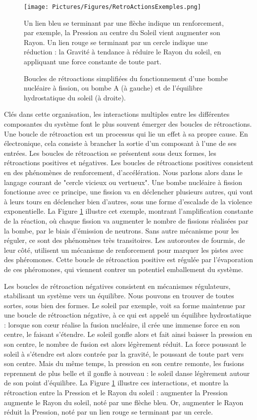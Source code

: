 			\begin{figure}
			\centering
			\texttt{[image: Pictures/Figures/RetroActionsExemples.png]}
			\caption{Boucles de rétroactions simplifiées du fonctionnement d'une bombe nucléaire à fission, ou bombe A (à gauche) et de l'équilibre hydrostatique du soleil (à droite).}{ Un lien bleu se terminant par une flèche indique un renforcement, par exemple, la Pression au centre du Soleil vient augmenter son Rayon. Un lien rouge se terminant par un cercle indique une réduction : la Gravité à tendance à réduire le Rayon du soleil, en appliquant une force constante de toute part.}
			\label{retroActions}
			\end{figure}
		
		Clés dans cette organisation, les interactions multiples entre les différentes composantes du système font le plus souvent émerger des boucles de rétroactions. Une boucle de rétroaction est un processus qui lie un effet à sa propre cause. En électronique, cela consiste à brancher la sortie d'un composant à l'une de ses entrées. Les boucles de rétroaction se présentent sous deux formes, les rétroactions positives et négatives. Les boucles de rétroactions positives consistent en des phénomènes de renforcement, d'accélération. Nous parlons alors dans le langage courant de "cercle vicieux ou vertueux". Une bombe nucléaire à fission fonctionne avec ce principe, une fission va en déclencher plusieurs autres, qui vont à leurs tours en déclencher bien d'autres, sous une forme d'escalade de la violence exponentielle. La Figure \ref{retroActions} illustre cet exemple, montrant l'amplification constante de la réaction, où chaque fission va augmenter le nombre de fissions réalisées par la bombe, par le biais d'émission de neutrons. Sans autre mécanisme pour les réguler, ce sont des phénomènes très transitoires. Les autoroutes de fourmis, de leur côté, utilisent un mécanisme de renforcement pour marquer les pistes avec des phéromones. Cette boucle de rétroaction positive est régulée par l'évaporation de ces phéromones, qui viennent contrer un potentiel emballement du système. 
		
		Les boucles de rétroaction négatives consistent en mécanismes régulateurs, stabilisant un système vers un équilibre. Nous pouvons en trouver de toutes sortes, sous bien des formes. Le soleil par exemple, voit sa forme maintenue par une boucle de rétroaction négative, à ce qui est appelé un équilibre hydrostatique \cite{haubold_analytic_1992} : lorsque son cœur réalise la fusion nucléaire, il crée une immense force en son centre, le faisant s'étendre. Le soleil gonfle alors et fait ainsi baisser la pression en son centre, le nombre de fusion est alors légèrement réduit. La force poussant le soleil à s'étendre est alors contrée par la gravité, le poussant de toute part vers son centre. Mais du même temps, la pression en son centre remonte, les fusions reprennent de plus belle et il gonfle à nouveau : le soleil danse légèrement autour de son point d'équilibre. La Figure \ref{retroActions} illustre ces interactions, et montre la rétroaction entre la Pression et le Rayon du soleil : augmenter la Pression augmente le Rayon du soleil, noté par une flèche bleu. Or, augmenter le Rayon réduit la Pression, noté par un lien rouge se terminant par un cercle.
			
